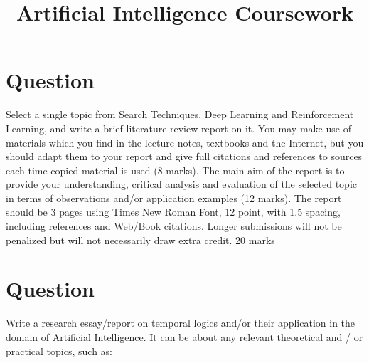 \documentclass[12pt,a4paper]{article}
\title{Artificial Intelligence Coursework}
\date{}
\begin{document}
	\maketitle
	
	
	\section{Question}
	Select a single topic from Search Techniques, Deep Learning and Reinforcement Learning, and write a brief literature review report on it.  You may make use of materials which you find in the lecture notes, textbooks and the Internet, but you should adapt them to your report and give full citations and references to sources each time copied material is used (8 marks).  The main aim of the report is to provide your understanding, critical analysis and evaluation of the selected topic in terms of observations and/or application examples (12 marks). The report should be 3 pages using Times New Roman Font, 12 point, with 1.5 spacing, including references and Web/Book citations. Longer submissions will not be penalized but will not necessarily draw extra credit. {20 marks}
	
	\section{Question}
	Write a research essay/report on temporal logics and/or their application in the domain of Artificial Intelligence. It can be about any relevant theoretical and / or practical topics, such as:
	
\end{document}

